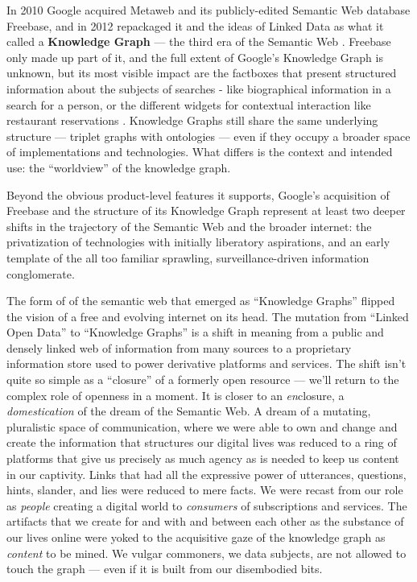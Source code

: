 \documentclass{article}
\begin{document}
In 2010 Google acquired Metaweb and its publicly-edited Semantic Web
database Freebase, and in 2012 repackaged it and the ideas of Linked
Data as what it called a \textbf{Knowledge Graph} --- the third era of
the Semantic Web \cite{singhalIntroducingKnowledgeGraph2012, iainFreebaseDeadLong2016} . Freebase only made up part of it, and the
full extent of Google's Knowledge Graph is unknown, but its most visible
impact are the factboxes that present structured information about the
subjects of searches - like biographical information in a search for a
person, or the different widgets for contextual interaction like
restaurant reservations \cite{noyIndustryscaleKnowledgeGraphs2019} . Knowledge Graphs still share
the same underlying structure --- triplet graphs with ontologies ---
even if they occupy a broader space of implementations and technologies.
What differs is the context and intended use: the ``worldview'' of the
knowledge graph.

Beyond the obvious product-level features it supports, Google's
acquisition of Freebase and the structure of its Knowledge Graph
represent at least two deeper shifts in the trajectory of the Semantic
Web and the broader internet: the privatization of technologies with
initially liberatory aspirations, and an early template of the all too
familiar sprawling, surveillance-driven information conglomerate.

The form of of the semantic web that emerged as ``Knowledge Graphs''
flipped the vision of a free and evolving internet on its head. The
mutation from ``Linked Open Data'' \cite{berners-leeLinkedData2006}  to ``Knowledge Graphs'' is a shift in meaning from a public and
densely linked web of information from many sources to a proprietary
information store used to power derivative platforms and services. The
shift isn't quite so simple as a ``closure'' of a formerly open resource
--- we'll return to the complex role of openness in a moment. It is
closer to an \emph{en}closure, a \emph{domestication} of the dream of
the Semantic Web. A dream of a mutating, pluralistic space of
communication, where we were able to own and change and create the
information that structures our digital lives was reduced to a ring of
platforms that give us precisely as much agency as is needed to keep us
content in our captivity. Links that had all the expressive power of
utterances, questions, hints, slander, and lies were reduced to mere
facts. We were recast from our role as \emph{people} creating a digital
world to \emph{consumers} of subscriptions and services. The artifacts
that we create for and with and between each other as the substance of
our lives online were yoked to the acquisitive gaze of the knowledge
graph as \emph{content} to be mined. We vulgar commoners, we data
subjects, are not allowed to touch the graph --- even if it is built
from our disembodied bits.
\end{document}
